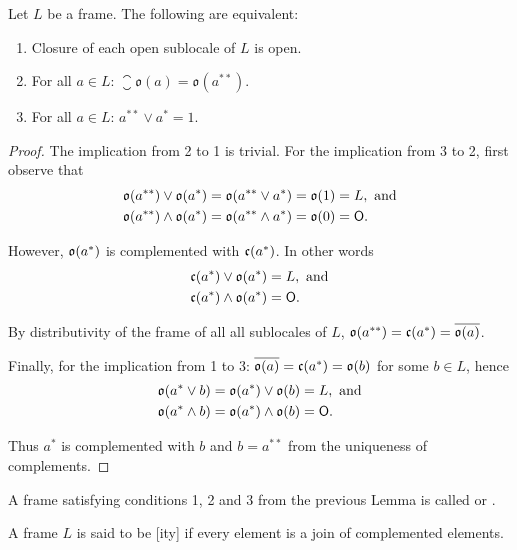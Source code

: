 \begin{lemma}
    Let $L$ be a frame. The following are equivalent:

    \begin{enumerate}
        \item Closure of each open sublocale of $L$ is open.
        \item For all $a \in L$: $\closure{\mathfrak{o}(a)} = \mathfrak{o}(a^{**})$.
        \item For all $a \in L$: $a^{**} \vee a^* = 1$.
    \end{enumerate}
\end{lemma}
\begin{proof}
    The implication from 2 to 1 is trivial. For the implication from 3 to 2, first observe that
    \begin{align*}
        \mathfrak{o}(a^{**})\vee \mathfrak{o}(a^*) &= \mathfrak{o}(a^{**}\vee a^*) = \mathfrak{o}(1) = L, \text{ and} \\
        \mathfrak{o}(a^{**})\wedge \mathfrak{o}(a^*) &= \mathfrak{o}(a^{**}\wedge a^*) = \mathfrak{o}(0) = \mathsf{O}.
    \end{align*}

    \noindent However, $\mathfrak{o}(a^*)$ is complemented with $\mathfrak{c}(a^*)$. In other words
    \begin{align*}
        \mathfrak{c}(a^*)\vee \mathfrak{o}(a^*) &= L, \text{ and} \\
        \mathfrak{c}(a^*)\wedge \mathfrak{o}(a^*) &= \mathsf{O}.
    \end{align*}

    \noindent By distributivity of the frame of all all sublocales of $L$, $\mathfrak{o}(a^{**}) = \mathfrak{c}(a^*) = \overline{\mathfrak{o}(a)}$.

    Finally, for the implication from 1 to 3: $\overline{\mathfrak{o}(a)} = \mathfrak{c}(a^*) = \mathfrak{o}(b)$ for some $b \in L$, hence
    \begin{align*}
        \mathfrak{o}(a^*\vee b) &= \mathfrak{o}(a^*)\vee   \mathfrak{o}(b) = L, \text{ and} \\
        \mathfrak{o}(a^*\wedge b) &= \mathfrak{o}(a^*)\wedge \mathfrak{o}(b) = \mathsf{O}.
    \end{align*}

    \noindent Thus $a^*$ is complemented with $b$ and $b = a^{**}$ from the uniqueness of complements.
\end{proof}

\begin{definition}
    A frame satisfying conditions 1, 2 and 3 from the previous Lemma is called  or .

    \vspace{0.8em}
    A frame $L$ is said to be [ity] if every element is a join of complemented elements.
\end{definition}

